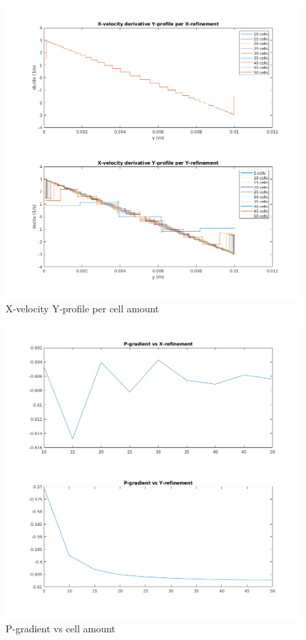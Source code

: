 \documentclass[12pt]{article}
\begin{document}
        \begin{figure}[!ht]
                \includegraphics[width=\textwidth]{Grid_Ind_U_Profiles.png}
                \centering
                \caption{X-velocity Y-profile per cell amount}
                \label{fig:grid_ind_u}
        \end{figure}

        \begin{figure}[!ht]
                \includegraphics[width=\textwidth]{Grid_Ind_P_Gradient.png}
                \centering
                \caption{P-gradient vs cell amount}
                \label{fig:grid_ind_p}
        \end{figure}
\end{document}
